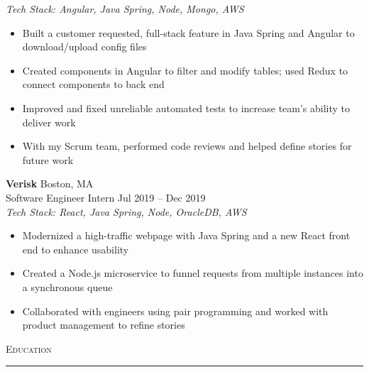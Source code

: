 \documentclass[11pt]{article}
\begin{document}
\begin{raggedright}
	\textit{Tech Stack: Angular, Java Spring, Node, Mongo, AWS} \\
	\begin{itemize}
		\item Built a customer requested, full-stack feature in Java Spring and Angular to download/upload config files
		\item Created components in Angular to filter and modify tables; used Redux to connect components to back end
		\item Improved and fixed unreliable automated tests to increase team's ability to deliver work
		\item With my Scrum team, performed code reviews and helped define stories for future work	\end{itemize}
	\vspace{0.1in}
	
	\textbf{\large Verisk} \hfill Boston, MA \\
	Software Engineer Intern \hfill Jul 2019 -- Dec 2019 \\
	\textit{Tech Stack: React, Java Spring, Node, OracleDB, AWS} \\
	\begin{itemize}
		\item Modernized a high-traffic webpage with Java Spring and a new React front end to enhance usability
		\item Created a Node.js microservice to funnel requests from multiple instances into a synchronous queue
		\item Collaborated with engineers using pair programming and worked with product management to refine stories
	\end{itemize}
	\vspace{0.15in}
	

	\textsc{\Large Education} \\
	\vspace{-0.1in}
	\rule{\textwidth}{0.4pt} \\
	\vspace{0.05in}


\end{raggedright}
\end{document}
